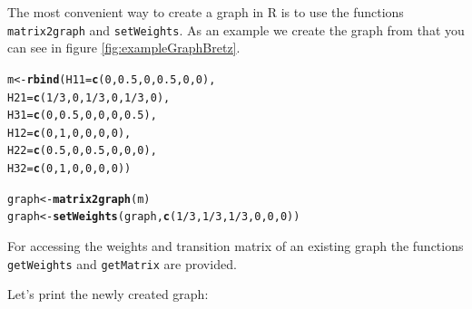 \documentclass[a4paper, 10pt]{article}\usepackage[]{graphicx}\usepackage[]{color}
\makeatletter
\newcommand{\hlnum}[1]{\textcolor[rgb]{0.686,0.059,0.569}{#1}}%
\newcommand{\hlopt}[1]{\textcolor[rgb]{0,0,0}{#1}}%
\newcommand{\hlstd}[1]{\textcolor[rgb]{0.345,0.345,0.345}{#1}}%
\newcommand{\hlkwb}[1]{\textcolor[rgb]{0.69,0.353,0.396}{#1}}%
\newcommand{\hlkwc}[1]{\textcolor[rgb]{0.333,0.667,0.333}{#1}}%
\newcommand{\hlkwd}[1]{\textcolor[rgb]{0.737,0.353,0.396}{\textbf{#1}}}%
\newenvironment{kframe}{%
 \def\at@end@of@kframe{}%
 \ifinner\ifhmode%
  \def\at@end@of@kframe{\end{minipage}}%
  \begin{minipage}{\columnwidth}%
 \fi\fi%
 \def\FrameCommand##1{\hskip\@totalleftmargin \hskip-\fboxsep
 \colorbox{shadecolor}{##1}\hskip-\fboxsep
     \hskip-\linewidth \hskip-\@totalleftmargin \hskip\columnwidth}%
 \MakeFramed {\advance\hsize-\width
   \@totalleftmargin\z@ \linewidth\hsize
   \@setminipage}}%
 {\par\unskip\endMakeFramed%
 \at@end@of@kframe}
\newenvironment{knitrout}{}{} %
\numberwithin{equation}{section}
\theoremstyle{definition}
\theoremstyle{plain}
\makeatother
\begin{document}
The most convenient way to create a graph in R is to use the functions
\texttt{matrix2graph} and
\texttt{setWeights}.  As an example we create the
graph from \cite{bretz2011test} that you can see in
figure \ref{fig:exampleGraphBretz}.

\begin{knitrout}\footnotesize
{}\color{fgcolor}\begin{kframe}
\begin{alltt}
\hlstd{m} \hlkwb{<-} \hlkwd{rbind}\hlstd{(}\hlkwc{H11}\hlstd{=}\hlkwd{c}\hlstd{(}\hlnum{0}\hlstd{,}   \hlnum{0.5}\hlstd{,} \hlnum{0}\hlstd{,}   \hlnum{0.5}\hlstd{,} \hlnum{0}\hlstd{,}   \hlnum{0}  \hlstd{),}
           \hlkwc{H21}\hlstd{=}\hlkwd{c}\hlstd{(}\hlnum{1}\hlopt{/}\hlnum{3}\hlstd{,} \hlnum{0}\hlstd{,}   \hlnum{1}\hlopt{/}\hlnum{3}\hlstd{,} \hlnum{0}\hlstd{,}   \hlnum{1}\hlopt{/}\hlnum{3}\hlstd{,} \hlnum{0}  \hlstd{),}
           \hlkwc{H31}\hlstd{=}\hlkwd{c}\hlstd{(}\hlnum{0}\hlstd{,}   \hlnum{0.5}\hlstd{,} \hlnum{0}\hlstd{,}   \hlnum{0}\hlstd{,}   \hlnum{0}\hlstd{,}   \hlnum{0.5}\hlstd{),}
           \hlkwc{H12}\hlstd{=}\hlkwd{c}\hlstd{(}\hlnum{0}\hlstd{,}   \hlnum{1}\hlstd{,}   \hlnum{0}\hlstd{,}   \hlnum{0}\hlstd{,}   \hlnum{0}\hlstd{,}   \hlnum{0}  \hlstd{),}
           \hlkwc{H22}\hlstd{=}\hlkwd{c}\hlstd{(}\hlnum{0.5}\hlstd{,} \hlnum{0}\hlstd{,}   \hlnum{0.5}\hlstd{,} \hlnum{0}\hlstd{,}   \hlnum{0}\hlstd{,}   \hlnum{0}  \hlstd{),}
           \hlkwc{H32}\hlstd{=}\hlkwd{c}\hlstd{(}\hlnum{0}\hlstd{,}   \hlnum{1}\hlstd{,}   \hlnum{0}\hlstd{,}   \hlnum{0}\hlstd{,}   \hlnum{0}\hlstd{,}   \hlnum{0}  \hlstd{))}

\hlstd{graph} \hlkwb{<-} \hlkwd{matrix2graph}\hlstd{(m)}
\hlstd{graph} \hlkwb{<-} \hlkwd{setWeights}\hlstd{(graph,} \hlkwd{c}\hlstd{(}\hlnum{1}\hlopt{/}\hlnum{3}\hlstd{,} \hlnum{1}\hlopt{/}\hlnum{3}\hlstd{,} \hlnum{1}\hlopt{/}\hlnum{3}\hlstd{,} \hlnum{0}\hlstd{,} \hlnum{0}\hlstd{,} \hlnum{0}\hlstd{))}
\end{alltt}
\end{kframe}
\end{knitrout}


For accessing the weights and transition matrix of an existing graph
the functions \texttt{getWeights} and \texttt{getMatrix} are provided.

Let's print the newly created graph:
\end{document}
